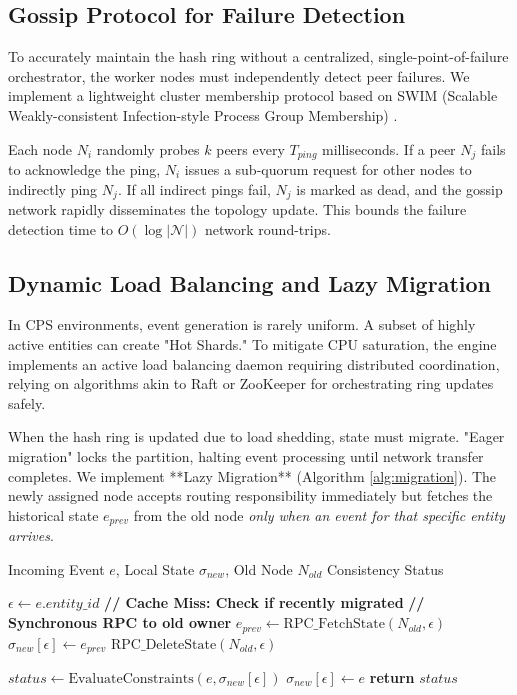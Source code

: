 \documentclass[conference]{IEEEtran}
\providecommand{\RETURN}{\STATE \textbf{return} }
\begin{document}
\subsection{Gossip Protocol for Failure Detection}
To accurately maintain the hash ring without a centralized, single-point-of-failure orchestrator, the worker nodes must independently detect peer failures. We implement a lightweight cluster membership protocol based on SWIM (Scalable Weakly-consistent Infection-style Process Group Membership) \cite{b7}. 

Each node $N_i$ randomly probes $k$ peers every $T_{ping}$ milliseconds. If a peer $N_j$ fails to acknowledge the ping, $N_i$ issues a sub-quorum request for other nodes to indirectly ping $N_j$. If all indirect pings fail, $N_j$ is marked as dead, and the gossip network rapidly disseminates the topology update. This bounds the failure detection time to $O(\log |\mathcal{N}|)$ network round-trips.

\subsection{Dynamic Load Balancing and Lazy Migration}
In CPS environments, event generation is rarely uniform. A subset of highly active entities can create "Hot Shards." To mitigate CPU saturation, the engine implements an active load balancing daemon requiring distributed coordination, relying on algorithms akin to Raft \cite{b20} or ZooKeeper \cite{b21} for orchestrating ring updates safely.

When the hash ring is updated due to load shedding, state must migrate. "Eager migration" locks the partition, halting event processing until network transfer completes. We implement **Lazy Migration** (Algorithm \ref{alg:migration}). The newly assigned node accepts routing responsibility immediately but fetches the historical state $e_{prev}$ from the old node \textit{only when an event for that specific entity arrives}.

\begin{algorithm}[h]
\caption{Lazy State Migration Protocol (On Node $N_{new}$)}
\begin{algorithmic}[1]
\REQUIRE Incoming Event $e$, Local State $\sigma_{new}$, Old Node $N_{old}$
\ENSURE Consistency Status

\STATE $\epsilon \leftarrow e.entity\_id$
    \STATE \textbf{// Cache Miss: Check if recently migrated}
        \STATE \textbf{// Synchronous RPC to old owner}
        \STATE $e_{prev} \leftarrow \text{RPC\_FetchState}(N_{old}, \epsilon)$
            \STATE $\sigma_{new}[\epsilon] \leftarrow e_{prev}$
            \STATE $\text{RPC\_DeleteState}(N_{old}, \epsilon)$ 
        \ENDIF
    \ENDIF
\ENDIF

\STATE $status \leftarrow \text{EvaluateConstraints}(e, \sigma_{new}[\epsilon])$
    \STATE $\sigma_{new}[\epsilon] \leftarrow e$
\ENDIF
\RETURN $status$
\end{algorithmic}
\label{alg:migration}
\end{algorithm}
\end{document}
